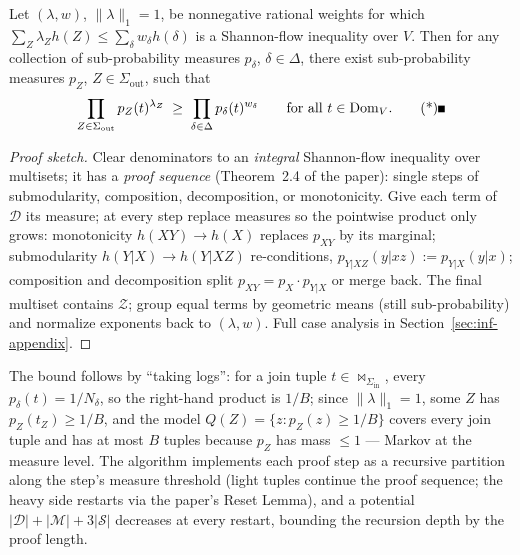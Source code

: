 \begin{lemma}
\label{lem:inf-panda-measures}
Let $(\lambda, w)$, $\|\lambda\|_1 = 1$, be nonnegative rational weights for which
$\sum_Z \lambda_Z h(Z) \le \sum_\delta w_\delta h(\delta)$ is a Shannon-flow inequality
over $V$. Then for any collection of sub-probability measures $p_\delta$, $\delta \in
\Delta$, there exist sub-probability measures $p_Z$, $Z \in \Sigma_{\mathrm{out}}$,
such that
\[
\prod_{Z \in \Sigma_{\mathrm{out}}} p_Z(t)^{\lambda_Z} \;\ge\;
\prod_{\delta \in \Delta} p_\delta(t)^{w_\delta}
\qquad \text{for all } t \in \mathrm{Dom}_V. \eopm
\]
\end{lemma}

\begin{proof}[Proof sketch]
Clear denominators to an \emph{integral} Shannon-flow inequality over multisets; it
has a \emph{proof sequence} (Theorem~2.4 of the paper): single steps of submodularity,
composition, decomposition, or monotonicity. Give each term of $\mathcal{D}$ its
measure; at every step replace measures so the pointwise product only grows:
monotonicity $h(XY) \to h(X)$ replaces $p_{XY}$ by its marginal; submodularity
$h(Y|X) \to h(Y|XZ)$ re-conditions, $p_{Y|XZ}(y|xz) := p_{Y|X}(y|x)$; composition and
decomposition split $p_{XY} = p_X \cdot p_{Y|X}$ or merge back. The final multiset
contains $\mathcal{Z}$; group equal terms by geometric means (still sub-probability)
and normalize exponents back to $(\lambda, w)$. Full case analysis in
Section~\ref{sec:inf-appendix}.
\end{proof}

The bound follows by ``taking logs'': for a join tuple $t \in
\Join_{\Sigma_{\mathrm{in}}}$, every $p_\delta(t) = 1/N_\delta$, so the right-hand
product is $1/B$; since $\|\lambda\|_1 = 1$, some $Z$ has $p_Z(t_Z) \ge 1/B$, and the
model $Q(Z) = \{z : p_Z(z) \ge 1/B\}$ covers every join tuple and has at most $B$
tuples because $p_Z$ has mass $\le 1$ --- Markov at the measure level.
 The algorithm
implements each proof step as a recursive partition along the step's measure threshold
(light tuples continue the proof sequence; the heavy side restarts via the paper's
Reset Lemma), and a potential $|\mathcal{D}| + |\mathcal{M}| + 3|\mathcal{S}|$
decreases at every restart, bounding the recursion depth by the proof length.

